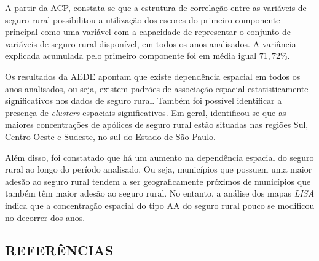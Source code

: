 
A partir da ACP, constata-se que a estrutura de correlação entre as variáveis de seguro rural possibilitou a utilização dos escores do primeiro componente principal como uma variável com a capacidade de representar o conjunto de variáveis de seguro rural disponível, em todos os anos analisados. A variância explicada acumulada pelo primeiro componente foi em média igual $71,72\%$. 

Os resultados da AEDE apontam que existe dependência espacial em todos os anos analisados, ou seja, existem padrões de associação espacial estatisticamente significativos nos dados de seguro rural. Também foi possível identificar a presença de \textit{clusters} espaciais significativos. Em geral, identificou-se que as maiores concentrações de apólices de seguro rural estão situadas nas regiões Sul, Centro-Oeste e Sudeste, no sul do Estado de São Paulo. 

Além disso, foi constatado que há um aumento na dependência espacial do seguro rural ao longo do período analisado. Ou seja, municípios que possuem uma maior adesão ao seguro rural tendem a ser geograficamente próximos de municípios que também têm maior adesão ao seguro rural. No entanto, a análise dos mapas \textit{LISA} indica que a concentração espacial  do tipo AA do seguro rural pouco se modificou no decorrer dos anos. 


\newpage
{}
\begin{center}
\section*{REFERÊNCIAS} 
\end{center}
